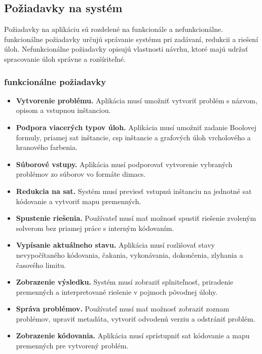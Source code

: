 \subsection{Požiadavky na systém}\label{sec:design:requirements}
Požiadavky na aplikáciu sú rozdelené na funkcionále a nefunkcionálne. funkcionálne požiadavky určujú správanie systému pri zadávaní, redukcii a riešení úloh. Nefunkcionálne požiadavky opisujú vlastnosti návrhu, ktoré majú udržať spracovanie úloh správne a rozšíriteľné.

\subsubsection{funkcionálne požiadavky}\label{sec:design:functional-requirements}
\begin{itemize}
    \item \textbf{Vytvorenie problému.} Aplikácia musí umožniť vytvoriť problém s názvom, opisom a vstupnou inštanciou.
    \item \textbf{Podpora viacerých typov úloh.} Aplikácia musí umožniť zadanie Boolovej formuly, priamej \acrshort{sat} inštancie, \acrshort{csp} inštancie a grafových úloh vrcholového a hranového farbenia.
    \item \textbf{Súborové vstupy.} Aplikácia musí podporovať vytvorenie vybraných problémov zo súborov vo formáte \acrshort{dimacs}.
    \item \textbf{Redukcia na \acrshort{sat}.} Systém musí previesť vstupnú inštanciu na jednotné \acrshort{sat} kódovanie a vytvoriť mapu premenných.
    \item \textbf{Spustenie riešenia.} Používateľ musí mať možnosť spustiť riešenie zvoleným solverom bez priamej práce s interným kódovaním.
    \item \textbf{Vypísanie aktuálneho stavu.} Aplikácia musí rozlišovať stavy nevypočítaného kódovania, čakania, vykonávania, dokončenia, zlyhania a časového limitu.
    \item \textbf{Zobrazenie výsledku.} Systém musí zobraziť splniteľnosť, priradenie premenných a interpretované riešenie v pojmoch pôvodnej úlohy.
    \item \textbf{Správa problémov.} Používateľ musí mať možnosť zobraziť zoznam problémov, upraviť metadáta, vytvoriť odvodenú verziu a odstrániť problém.
    \item \textbf{Zobrazenie kódovania.} Aplikácia musí sprístupniť \acrshort{sat} kódovanie a mapu premenných pre vytvorený problém.
\end{itemize}

